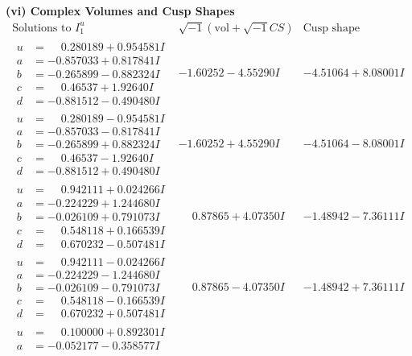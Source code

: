 \documentclass[1p]{elsarticle_modified}
\theoremstyle{definition}
\newcommand{\I}{\sqrt{-1}}
\begin{document}
\newpage\flushleft \textbf{(vi) Complex Volumes and Cusp Shapes}
$$\begin{array}{c|c|c}  
\text{Solutions to }I^u_{1}& \I (\text{vol} + \sqrt{-1}CS) & \text{Cusp shape}\\
 \hline 
\begin{aligned}
u &= \phantom{-}0.280189 + 0.954581 I \\
a &= -0.857033 + 0.817841 I \\
b &= -0.265899 - 0.882324 I \\
c &= \phantom{-}0.46537 + 1.92640 I \\
d &= -0.881512 - 0.490480 I\end{aligned}
 & -1.60252 - 4.55290 I & -4.51064 + 8.08001 I \\ \hline\begin{aligned}
u &= \phantom{-}0.280189 - 0.954581 I \\
a &= -0.857033 - 0.817841 I \\
b &= -0.265899 + 0.882324 I \\
c &= \phantom{-}0.46537 - 1.92640 I \\
d &= -0.881512 + 0.490480 I\end{aligned}
 & -1.60252 + 4.55290 I & -4.51064 - 8.08001 I \\ \hline\begin{aligned}
u &= \phantom{-}0.942111 + 0.024266 I \\
a &= -0.224229 + 1.244680 I \\
b &= -0.026109 + 0.791073 I \\
c &= \phantom{-}0.548118 + 0.166539 I \\
d &= \phantom{-}0.670232 - 0.507481 I\end{aligned}
 & \phantom{-}0.87865 + 4.07350 I & -1.48942 - 7.36111 I \\ \hline\begin{aligned}
u &= \phantom{-}0.942111 - 0.024266 I \\
a &= -0.224229 - 1.244680 I \\
b &= -0.026109 - 0.791073 I \\
c &= \phantom{-}0.548118 - 0.166539 I \\
d &= \phantom{-}0.670232 + 0.507481 I\end{aligned}
 & \phantom{-}0.87865 - 4.07350 I & -1.48942 + 7.36111 I \\ \hline\begin{aligned}
u &= \phantom{-}0.100000 + 0.892301 I \\
a &= -0.052177 - 0.358577 I \\

\end{aligned}
\end{array}$$
\end{document}
